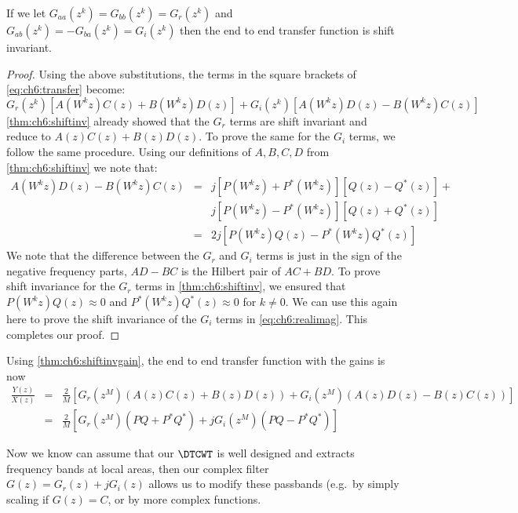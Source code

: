 \begin{theorem}\label{thm:ch6:shiftinvgain}
  If we let $G_{aa}(z^k) = G_{bb}(z^k) = G_r(z^k)$ and $G_{ab}(z^k) = -G_{ba}(z^k) = G_i(z^k)$
  then the end to end transfer function is shift invariant.
\end{theorem}
\begin{proof}
  Using the above substitutions, the terms in the square brackets of
  \eqref{eq:ch6:transfer} become:
  \begin{equation}\label{eq:ch6:realimag}
    G_r(z^k)\left[A(W^kz)C(z) + B(W^kz)D(z)\right] + G_i(z^k)\left[A(W^kz)D(z) - B(W^kz)C(z)\right]
  \end{equation}
  \autoref{thm:ch6:shiftinv} already showed that the $G_r$ terms are shift
  invariant and reduce to $A(z)C(z) + B(z)D(z)$. To prove the same for the $G_i$
  terms, we follow the same procedure. Using our definitions of $A, B, C, D$
  from \autoref{thm:ch6:shiftinv} we note that:
  \begin{eqnarray}
    A(W^kz)D(z) - B(W^kz)C(z) &=& j\left[P(W^kz) + P^*(W^kz)\right]\left[Q(z) -Q^*(z)\right] +\\
                              &&j\left[P(W^kz) -P^*(W^kz)\right]\left[Q(z) + Q^*(z)\right] \\
                              &=& 2j\left[P(W^kz)Q(z) - P^*(W^kz)Q^*(z)\right]
  \end{eqnarray}
  We note that the difference
  between the $G_r$ and $G_i$ terms is just in the sign of the negative
  frequency parts, $AD - BC$ is the Hilbert pair of $AC+BD$. To prove shift
  invariance for the $G_r$ terms in \autoref{thm:ch6:shiftinv}, we ensured that
  $P(W^kz)Q(z) \approx 0$ and $P^*(W^kz)Q^*(z) \approx 0$ for $k\neq 0$. We can
  use this again here to prove the shift invariance of the $G_i$ terms in
  \eqref{eq:ch6:realimag}. This completes our proof.
\end{proof}

Using \autoref{thm:ch6:shiftinvgain}, the end to end transfer function with the
gains is now
\begin{eqnarray}
  \frac{Y(z)}{X(z)} &=& \frac{2}{M} \left[G_r(z^{M}) \left(A(z)C(z) + B(z)D(z)\right)
  + G_i(z^{M}) \left(A(z)D(z) - B(z)C(z)\right) \right] \\
  &=& \frac{2}{M}\left[G_r(z^{M}) \left(PQ + P^*Q^*\right)
  + jG_i(z^{M}) \left(PQ - P^*Q^*\right) \right] 
\end{eqnarray}

Now we know can assume that our $\DTCWT$ is well designed and extracts frequency
bands at local areas, then our complex filter $G(z)=G_r(z) + jG_i(z)$ allows us
to modify these passbands (e.g.\ by simply scaling if $G(z) = C$, or by more
complex functions.

